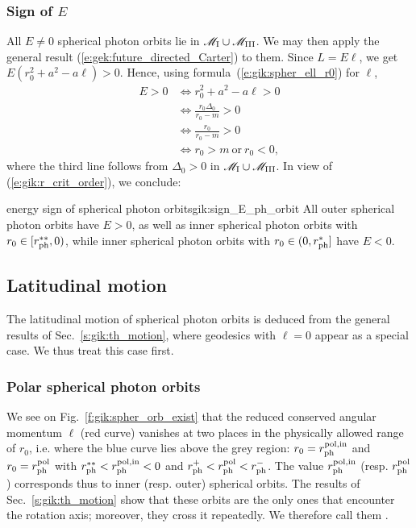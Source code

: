 \subsubsection{Sign of $E$}

All $E\neq 0$ spherical photon orbits lie in $\mathscr{M}_{\rm I}\cup\mathscr{M}_{\rm III}$. We may then apply
the general result (\ref{e:gek:future_directed_Carter}) to them. Since $L = E \ell$, we get
$E (r_0^2 + a^2 - a \ell) > 0$.
Hence, using formula~(\ref{e:gik:spher_ell_r0}) for $\ell$,
\begin{align}
E > 0 & \iff r_0^2 + a^2 - a \ell > 0 \nonumber \\
      & \iff \frac{r_0 \Delta_0}{r_0 - m} > 0 \nonumber \\
      & \iff \frac{r_0}{r_0 - m} > 0  \nonumber \\
      & \iff r_0 > m \ \mbox{or}\ r_0 < 0 , \nonumber
\end{align}
where the third line follows from $\Delta_0 > 0$ in $\mathscr{M}_{\rm I}\cup\mathscr{M}_{\rm III}$.
In view of (\ref{e:gik:r_crit_order}), we conclude:
\begin{tprop}{energy sign of spherical photon orbits}{gik:sign_E_ph_orbit}
All outer spherical photon orbits have $E>0$, as well as inner spherical photon
orbits with $r_0\in[r_{\rm ph}^{**}, 0)$, %
while inner spherical photon orbits with $r_0\in(0, r_{\rm ph}^*]$
have $E<0$.
\end{tprop}

\subsection{Latitudinal motion} \label{s:gik:spher_latitudinal}

The latitudinal motion of spherical photon orbits is
deduced from the general results of Sec.~\ref{s:gik:th_motion},
where geodesics with $\ell=0$ appear as a special case. We thus treat this
case first.

\subsubsection{Polar spherical photon orbits}

We see on Fig.~\ref{f:gik:spher_orb_exist} that the reduced conserved
angular momentum $\ell$ (red curve) vanishes at two
places in the physically allowed range of $r_0$,
i.e. where the blue curve lies above the grey region:
$r_0=r_{\rm ph}^{\rm pol,in}$ and $r_0=r_{\rm ph}^{\rm pol}$
with $r_{\rm ph}^{**} < r_{\rm ph}^{\rm pol,in} < 0$ and
$r_{\rm ph}^+ < r_{\rm ph}^{\rm pol} < r_{\rm ph}^-$.
The value $r_{\rm ph}^{\rm pol,in}$ (resp. $r_{\rm ph}^{\rm pol}$)
corresponds thus to inner (resp. outer) spherical orbits.
The results of Sec.~\ref{s:gik:th_motion} show that these orbits
are the only ones that encounter the rotation axis; moreover, they
cross it repeatedly.
We therefore call them
.

